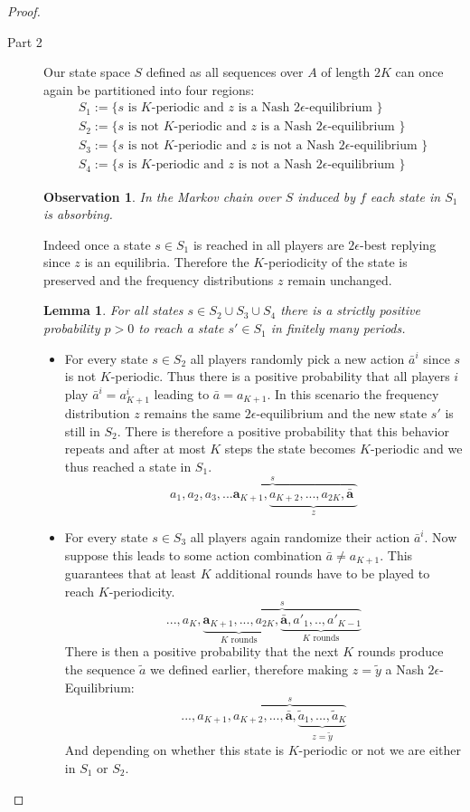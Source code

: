 \documentclass[a4paper]{article}
\theoremstyle{plain}
\newtheorem{observation}{Observation}
\newtheorem{lemma}{Lemma}
\theoremstyle{remark}
\begin{document}
\begin{proof}
\begin{description}
		\item[Part 2] Our state space $S$ defined as all sequences over $A$ of length $2K$ can once again be partitioned
		into four regions:
		\begin{gather*}
			S_1 := \{ s \text{ is $K$-periodic and $z$ is a Nash $2\epsilon$-equilibrium }\}\\
			S_2 := \{ s \text{ is not $K$-periodic and $z$ is a Nash $2\epsilon$-equilibrium }\}\\
			S_3 := \{ s \text{ is not $K$-periodic and $z$ is not a Nash $2\epsilon$-equilibrium }\}\\
			S_4 := \{ s \text{ is $K$-periodic and $z$ is not a Nash $2\epsilon$-equilibrium }\}
		\end{gather*}
		\begin{observation}
			In the Markov chain over $S$ induced by $f$ each state in $S_1$ is absorbing.
		\end{observation}
		Indeed once a state $s \in S_1$ is reached in all players are $2\epsilon$-best replying since $z$ is
		an equilibria. Therefore the $K$-periodicity of the state is preserved and
		the frequency distributions $z$ remain unchanged.
		\begin{lemma}
			For all states $s \in S_2 \cup S_3 \cup S_4$ there is a strictly positive probability $p > 0$ to
			reach a state $s' \in S_1$ in finitely many periods. %
		\end{lemma}
		
		\begin{itemize}
			\item For every state $s \in S_2$ all players randomly pick a new action $\bar{a}^i$ since $s$ is not $K$-periodic.
			Thus there is a positive probability that all players $i$ play $\bar{a}^i = a^i_{K+1}$ leading to $\bar{a} = a_{K+1}$.
			In this scenario the frequency distribution
			$z$ remains the same $2\epsilon$-equilibrium and the new state $s'$ is still in $S_2$.
			There is therefore a positive probability that this behavior repeats and after at most $K$ steps the state becomes $K$-periodic
			and we thus reached a state in $S_1$.
				\[
				a_1, \overbrace{a_2, a_3, ... \mathbf{a}_{K+1},  \underbrace{a_{K+2}, ..., a_{2K}, \mathbf{\bar{a}} \,\, }_{z}}^{s}
				\]
			
			\item For every state $s \in S_3$ all players again randomize their action  $\bar{a}^i$.
			Now suppose this leads to some action combination $\bar{a} \neq a_{K+1}$. This guarantees that at least
			$K$ additional rounds have to be played to reach $K$-periodicity.
				\[
				..., a_{K},  \overbrace{\underbrace{\mathbf{a}_{K+1},  ..., a_{2K}}_{K \text{ rounds}}, \underbrace{\mathbf{\bar{a}}, a'_1, .., a'_{K-1}}_{K \text{ rounds}} }^{s}
				\]
			There is then a positive probability that the next $K$ rounds produce the sequence $\tilde{a}$ we defined
			earlier, therefore making $z = \tilde{y}$ a Nash $2\epsilon$-Equilibrium:
				\[
				..., a_{K+1}, \overbrace{a_{K+2}, ... , \mathbf{\bar{a}},  \underbrace{\tilde{a}_1, ..., \tilde{a}_{K} }_{z = \tilde{y}}}^{s}
				\]
			And depending on whether this state is $K$-periodic or not we are either in $S_1$ or $S_2$.
			

\end{itemize}
\end{description}
\end{proof}
\end{document}

